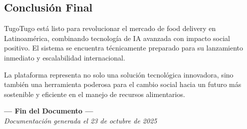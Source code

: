 \documentclass[a4paper,12pt]{article}
\begin{document}
\subsection{Conclusión Final}
TugoTugo está listo para revolucionar el mercado de food delivery en Latinoamérica, combinando tecnología de IA avanzada con impacto social positivo. El sistema se encuentra técnicamente preparado para su lanzamiento inmediato y escalabilidad internacional.

La plataforma representa no solo una solución tecnológica innovadora, sino también una herramienta poderosa para el cambio social hacia un futuro más sostenible y eficiente en el manejo de recursos alimentarios.

\vfill
\centering
\textbf{--- Fin del Documento ---}\\
\textit{Documentación generada el 23 de octubre de 2025}
\end{document}
